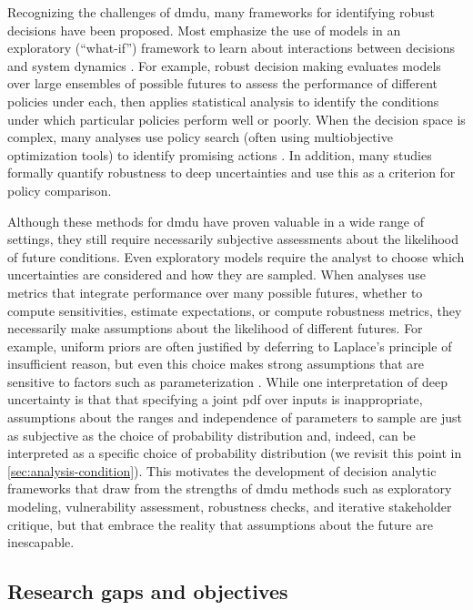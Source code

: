 \documentclass[11pt]{article}
\begin{document}
Recognizing the challenges of \gls{dmdu}, many frameworks for identifying robust decisions have been proposed.
Most emphasize the use of models in an exploratory (``what-if'') framework to learn about interactions between decisions and system dynamics \citep{bankes:1993}.
For example, robust decision making \citep{lempert_shaping:2003} evaluates models over large ensembles of possible futures to assess the performance of different policies under each, then applies statistical analysis to identify the conditions under which particular policies perform well or poorly.
When the decision space is complex, many analyses use policy search (often using multiobjective optimization tools) to identify promising actions \citep{kasprzyk:2013,kasprzyk_denovo:2012,hadka_mordm:2015}.
In addition, many studies formally quantify robustness to deep uncertainties \citep{herman:2015,mcphail_robustness:2019} and use this as a criterion for policy comparison.

Although these methods for \gls{dmdu} have proven valuable in a wide range of settings, they still require necessarily subjective assessments about the likelihood of future conditions.
Even exploratory models require the analyst to choose which uncertainties are considered and how they are sampled.
When analyses use metrics that integrate performance over many possible futures, whether to compute sensitivities, estimate expectations, or compute robustness metrics, they necessarily make assumptions about the likelihood of different futures.
For example, uniform priors are often justified by deferring to Laplace's principle of insufficient reason, but even this choice makes strong assumptions that are sensitive to factors such as parameterization \citep[p.54]{gelman_bda3:2014}.
While one interpretation of deep uncertainty is that that specifying a joint \gls{pdf} over inputs is inappropriate, assumptions about the ranges and independence of parameters to sample are just as subjective as the choice of probability distribution \citep{schneider_scenarios:2002,quinn_exploratory:2020} and, indeed, can be interpreted  as a specific choice of probability distribution (we revisit this point in \cref{sec:analysis-condition}).
This motivates the development of decision analytic frameworks that draw from the strengths of \gls{dmdu} methods such as exploratory modeling, vulnerability assessment, robustness checks, and iterative stakeholder critique, but that embrace the reality that assumptions about the future are inescapable.

\subsection{Research gaps and objectives}
\end{document}
